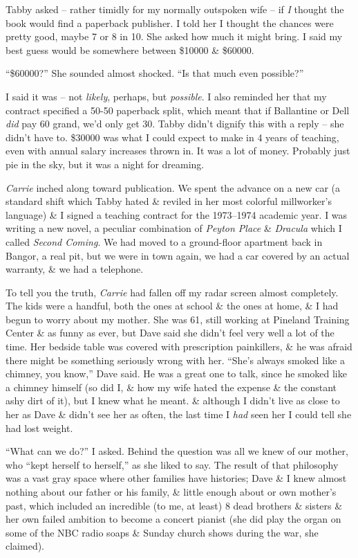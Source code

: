 \documentclass{article}
\numberwithin{equation}{section}
\begin{document}
Tabby asked -- rather timidly for my normally outspoken wife -- if \textit{I} thought the book would find a paperback publisher. I told her I thought the chances were pretty good, maybe 7 or 8 in 10. She asked how much it might bring. I said my best guess would be somewhere between \$10000 \& \$60000.

``\$60000?'' She sounded almost shocked. ``Is that much even possible?''

I said it was -- not \textit{likely}, perhaps, but \textit{possible}. I also reminded her that my contract specified a 50-50 paperback split, which meant that if Ballantine or Dell \textit{did} pay 60 grand, we'd only get 30. Tabby didn't dignify this with a reply -- she didn't have to. \$30000 was what I could expect to make in 4 years of teaching, even with annual salary increases thrown in. It was a lot of money. Probably just pie in the sky, but it was a night for dreaming.

 \textit{Carrie} inched along toward publication. We spent the advance on a new car (a standard shift which Tabby hated \& reviled in her most colorful millworker's language) \& I signed a teaching contract for the 1973--1974 academic year. I was writing a new novel, a peculiar combination of \textit{Peyton Place} \& \textit{Dracula} which I called \textit{Second Coming}. We had moved to a ground-floor apartment back in Bangor, a real pit, but we were in town again, we had a car covered by an actual warranty, \& we had a telephone.

To tell you the truth, \textit{Carrie} had fallen off my radar screen almost completely. The kids were a handful, both the ones at school \& the ones at home, \& I had begun to worry about my mother. She was 61, still working at Pineland Training Center \& as funny as ever, but Dave said she didn't feel very well a lot of the time. Her bedside table was covered with prescription painkillers, \& he was afraid there might be something seriously wrong with her. ``She's always smoked like a chimney, you know,'' Dave said. He was a great one to talk, since he smoked like a chimney himself (so did I, \& how my wife hated the expense \& the constant ashy dirt of it), but I knew what he meant. \& although I didn't live as close to her as Dave \& didn't see her as often, the last time I \textit{had} seen her I could tell she had lost weight.

``What can we do?'' I asked. Behind the question was all we knew of our mother, who ``kept herself to herself,'' as she liked to say. The result of that philosophy was a vast gray space where other families have histories; Dave \& I knew almost nothing about our father or his family, \& little enough about or own mother's past, which included an incredible (to me, at least) 8 dead brothers \& sisters \& her own failed ambition to become a concert pianist (she did play the organ on some of the NBC radio soaps \& Sunday church shows during the war, she claimed).
\end{document}
